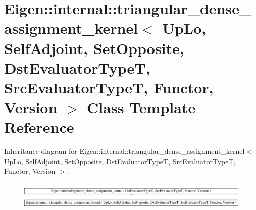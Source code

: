 \hypertarget{class_eigen_1_1internal_1_1triangular__dense__assignment__kernel_3_01_up_lo_00_01_self_adjoint_0bf432100a6648c0f02715a71126a9f44}{}\section{Eigen\+::internal\+::triangular\+\_\+dense\+\_\+assignment\+\_\+kernel$<$ Up\+Lo, Self\+Adjoint, Set\+Opposite, Dst\+Evaluator\+TypeT, Src\+Evaluator\+TypeT, Functor, Version $>$ Class Template Reference}
\label{class_eigen_1_1internal_1_1triangular__dense__assignment__kernel_3_01_up_lo_00_01_self_adjoint_0bf432100a6648c0f02715a71126a9f44}
Inheritance diagram for Eigen\+::internal\+::triangular\+\_\+dense\+\_\+assignment\+\_\+kernel$<$ Up\+Lo, Self\+Adjoint, Set\+Opposite, Dst\+Evaluator\+TypeT, Src\+Evaluator\+TypeT, Functor, Version $>$\+:\begin{figure}[H]
\begin{center}
\leavevmode
\includegraphics[height=1.314554cm]{class_eigen_1_1internal_1_1triangular__dense__assignment__kernel_3_01_up_lo_00_01_self_adjoint_0bf432100a6648c0f02715a71126a9f44}
\end{center}
\end{figure}
